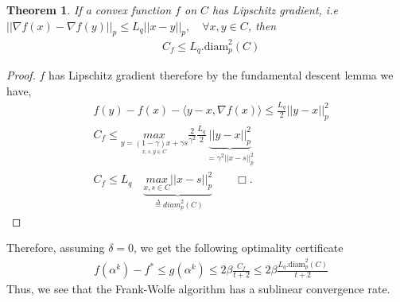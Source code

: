 \documentclass{article}
\newtheorem{theorem}{Theorem}
\begin{document}
\begin{theorem}
    If a convex function $f$ on $C$ has Lipschitz gradient, i.e $||\nabla f(x)- \nabla f(y)||_{p}\leq L_{q}||x- y||_{p},\quad\forall x,y\in C$, then
\begin{equation*}
\begin{aligned}
      &C_{f}\leq L_{q}.\text{diam}_{p}^{2}(C)
\end{aligned}
\end{equation*}
\end{theorem}
\begin{proof}
$f$ has Lipschitz gradient therefore by the fundamental descent lemma we have,
\begin{equation*}
\begin{aligned}
      &f(y)- f(x)- \langle y- x, \nabla f(x)\rangle \leq \frac{L_{q}}{2}||y- x||_{p}^{2}\\
      &C_{f} \leq \underset{\underset{x,s,y\in C}{y=(1-\gamma)x+\gamma s}}{max}\frac{2}{\gamma^{2}}\frac{L_{q}}{2}\underbrace{||y- x||_{p}^{2}}_{=\gamma^{2}||x- s||_{p}^{2}}\\
      &C_{f} \leq L_{q}\quad\underbrace{\underset{x,s\in C}{max}||x- s||_{p}^{2}}_{\overset{\Delta}{=}\textit{diam}_{p}^{2}(C)}\quad\quad\Box.
\end{aligned}    
\end{equation*}
\end{proof}
Therefore, assuming $\delta=0$, we get the following optimality certificate
\begin{equation*}
\begin{aligned}
      &f(\alpha^{k})- f^{*}\leq  g(\alpha^{k})\leq 2\beta\frac{C_{f}}{t+2}\leq 2\beta\frac{L_{q}.\text{diam}_{p}^{2}(C)}{t+2}
\end{aligned}    
\end{equation*}
Thus, we see that the Frank-Wolfe algorithm has a sublinear convergence rate.
\end{document}
